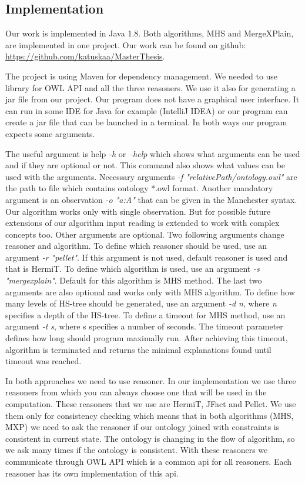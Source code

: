 \documentclass[12pt,a4paper]{article}
\begin{document}
\subsection{Implementation}
Our work is implemented in Java 1.8. Both algorithms, MHS and MergeXPlain, are implemented in one project. Our work can be found on github: \url{https://github.com/katuskaa/MasterThesis}. 

The project is using Maven for dependency management. We needed to use library for OWL API and all the three reasoners. We use it also for generating a jar file from our project. Our program does not have a graphical user interface. It can run in some IDE for Java for example (IntelliJ IDEA) or our program can create a jar file that can be launched in a terminal. In both ways our program expects some arguments. 

The useful argument is help \textit{-h} or \textit{--help} which shows what arguments can be used and if they are optional or not. This command also shows what values can be used with the arguments. Necessary arguments \textit{-f "relativePath/ontology.owl"} are the path to file which contains ontology *.owl format. Another mandatory argument is an observation \textit{-o "a:A"} that can be given in the Manchester syntax. Our algorithm works only with single observation. But for possible future extensions of our algorithm input reading is extended to work with complex concepts too. Other arguments are optional. Two following arguments change reasoner and algorithm. To define which reasoner should be used, use an argument \textit{-r "pellet"}. If this argument is not used, default reasoner is used and that is HermiT. To define which algorithm is used, use an argument \textit{-s "mergexplain"}. Default for this algorithm is MHS method. The last two arguments are also optional and works only with MHS algorithm. To define how many levels of HS-tree should be generated, use an argument \textit{-d n}, where \textit{n} specifies a depth of the HS-tree. To define a timeout for MHS method, use an argument \textit{-t s}, where s specifies a number of seconds. The timeout parameter defines how long should program maximally run. After achieving this timeout, algorithm is terminated and returns the minimal explanations found until timeout was reached.

In both approaches we need to use reasoner. In our implementation we use three reasoners from which you can always choose one that will be used in the computation. These reasoners that we use are HermiT, JFact and Pellet. We use them only for consistency checking which means that in both algorithms (MHS, MXP) we need to ask the reasoner if our ontology joined with constraints is consistent in current state. The ontology is changing in the flow of algorithm, so we ask many times if the ontology is consistent. With these reasoners we communicate through OWL API which is a common api for all reasoners. Each reasoner has its own implementation of this api.
\end{document}
